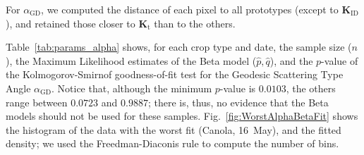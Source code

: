 \documentclass[journal]{IEEEtran}
\begin{document}
	For $\alpha_{\text{GD}}$, we computed the distance of each pixel to all prototypes (except to $\bm K_{\text{ID}}$), and retained those closer to $\bm K_{\text{t}}$ than to the others.
	
	Table~\ref{tab:params_alpha} shows, for each crop type and date, 
	the sample size ($n$), 
	the Maximum Likelihood estimates of the Beta model ($\widehat p,\widehat q$), and the $p$-value of the Kolmogorov-Smirnof goodness-of-fit test for the Geodesic Scattering Type Angle $\alpha_{\text{GD}}$.
	Notice that, although the minimum $p$-value is $0.0103$, the others range between $0.0723$ and $0.9887$; there is, thus, no evidence that the Beta models should not be used for these samples.
	Fig.~\ref{fig:WorstAlphaBetaFit} shows the histogram of the data with the worst fit (Canola, 16~May), and the fitted density; we used the Freedman-Diaconis rule to compute the number of bins.
	
\end{document}
